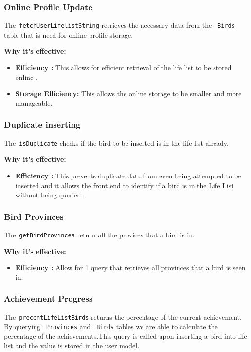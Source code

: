 \documentclass[a4paper]{article}
\begin{document}
\subsubsection{Online Profile Update}
The\texttt{\ fetchUserLifelistString} retrieves the necessary data from the \texttt{\ Birds} table that is need for online profile storage.

\textbf{Why it's effective:}
\begin{itemize}
    \item \textbf{Efficiency :} This allows for efficient retrieval of the life list to be stored online .
    \item \textbf{Storage Efficiency:} This allows the online storage to be smaller and more manageable.
\end{itemize}

\subsubsection{Duplicate inserting}
The\texttt{\ isDuplicate} checks if the bird to be inserted is in the life list already.

\textbf{Why it's effective:}
\begin{itemize}
    \item \textbf{Efficiency :} This prevents duplicate data from even being attempted to be inserted and it allows the front end to identify if a bird is in the Life List without being queried.
\end{itemize}

\subsubsection{Bird Provinces}
The\texttt{\ getBirdProvinces} return all the provices that a bird is in.

\textbf{Why it's effective:}
\begin{itemize}
    \item \textbf{Efficiency :} Allow for 1 query that retrieves all provinces that a bird is seen in.
\end{itemize}

\subsubsection{Achievement Progress}
The\texttt{\ precentLifeListBirds} returns the percentage of the current achievement. By querying \texttt{\ Provinces} and \texttt{\ Birds} tables we are able to calculate the percentage of the achievements.This query is called upon inserting a bird into life list and the value is stored in the user model.
\end{document}
